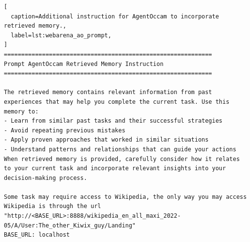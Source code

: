 \begin{lstlisting}[
  caption=Additional instruction for AgentOccam to incorporate retrieved memory.,
  label=lst:webarena_ao_prompt,
]
============================================================
Prompt AgentOccam Retrieved Memory Instruction
============================================================

The retrieved memory contains relevant information from past experiences that may help you complete the current task. Use this memory to:
- Learn from similar past tasks and their successful strategies
- Avoid repeating previous mistakes
- Apply proven approaches that worked in similar situations
- Understand patterns and relationships that can guide your actions
When retrieved memory is provided, carefully consider how it relates to your current task and incorporate relevant insights into your decision-making process.

Some task may require access to Wikipedia, the only way you may access Wikipedia is through the url "http://<BASE_URL>:8888/wikipedia_en_all_maxi_2022-05/A/User:The_other_Kiwix_guy/Landing"
BASE_URL: localhost

\end{lstlisting}